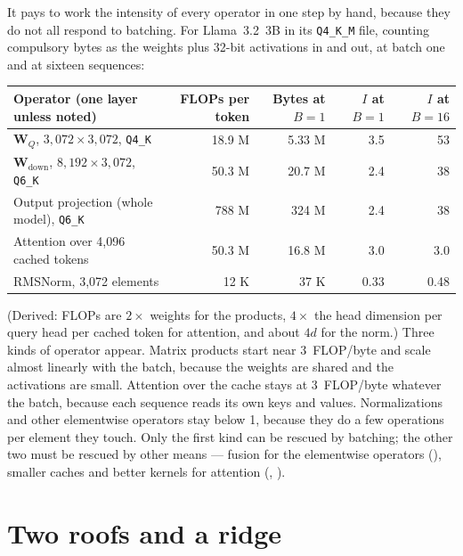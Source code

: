 It pays to work the intensity of every operator in one step by hand, because
they do not all respond to batching. For Llama~3.2~3B in its \texttt{Q4\_K\_M}
file, counting compulsory bytes as the weights plus 32-bit activations in and
out, at batch one and at sixteen sequences:

\begin{center}\small
\begin{tabular}{@{}lrrrr@{}}
\toprule
Operator (one layer unless noted) & FLOPs per token & Bytes at $B = 1$ & $I$ at $B = 1$ & $I$ at $B = 16$ \\
\midrule
$\mathbf{W}_Q$, $3{,}072 \times 3{,}072$, \texttt{Q4\_K} & 18.9 M & 5.33 M & 3.5 & 53 \\
$\mathbf{W}_{\mathrm{down}}$, $8{,}192 \times 3{,}072$, \texttt{Q6\_K} & 50.3 M & 20.7 M & 2.4 & 38 \\
Output projection (whole model), \texttt{Q6\_K} & 788 M & 324 M & 2.4 & 38 \\
Attention over 4,096 cached tokens & 50.3 M & 16.8 M & 3.0 & 3.0 \\
RMSNorm, 3,072 elements & 12 K & 37 K & 0.33 & 0.48 \\
\bottomrule
\end{tabular}
\end{center}

\noindent (Derived: FLOPs are $2 \times$ weights for the products, $4 \times$
the head dimension per query head per cached token for attention, and about
$4d$ for the norm.) Three kinds of operator appear. Matrix products start near
3~FLOP/byte and scale almost linearly with the batch, because the weights are
shared and the activations are small. Attention over the cache stays at
3~FLOP/byte whatever the batch, because each sequence reads its own keys and
values. Normalizations and other elementwise operators stay below 1, because
they do a few operations per element they touch. Only the first kind can be
rescued by batching; the other two must be rescued by other means --- fusion
for the elementwise operators (), smaller caches and
better kernels for attention (, ).

\section{Two roofs and a ridge}

